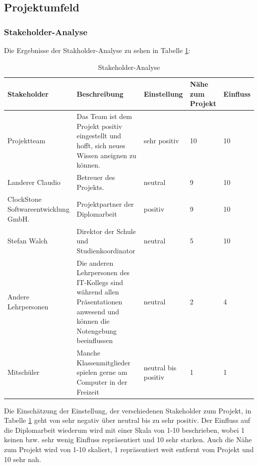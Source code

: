 \subsection{Projektumfeld}
\def \currentAuthor {Lukas Vogel} %
\subsubsection{Stakeholder-Analyse}
Die Ergebnisse der Stakholder-Analyse zu sehen in Tabelle \ref{Stakeholder-Analyse}:
\begin{table}[H]
		
	\renewcommand{\arraystretch}{1.5}
		\begin{tabular}{|p{3cm}|p{6cm}|p{3cm}|p{1.5cm}|p{1.5cm}|}
			\hline
			\textbf{Stakeholder} & \textbf{Beschreibung} & \textbf{Einstellung} & \textbf{Nähe zum Projekt} & \textbf{Einfluss} \\
			\hline
			Projektteam & Das Team ist dem Projekt positiv eingestellt und hofft, sich neues Wissen aneignen zu können. & sehr positiv & 10 & 10\\
			\hline
			Landerer Claudio & Betreuer des Projekts. & neutral & 9 &10\\
			\hline
			ClockStone Softwareentwicklung GmbH.& Projektpartner der Diplomarbeit & positiv & 9 & 10\\
			\hline
			Stefan Walch & Direktor der Schule und Studienkoordinator & neutral& 5 & 10\\
			\hline
			Andere Lehrpersonen & Die anderen Lehrpersonen des IT-Kollegs sind während allen Präsentationen anwesend und können die Notengebung beeinflussen & neutral& 2 & 4\\
			\hline
			Mitschüler & Manche Klassenmitglieder spielen gerne am Computer in der Freizeit	& neutral bis positiv & 1 & 1\\
			\hline
		\end{tabular}
\caption{Stakeholder-Analyse}
\label{Stakeholder-Analyse}
	\end{table}
Die Einschätzung der Einstellung, der verschiedenen Stakeholder zum Projekt, in Tabelle \ref{Stakeholder-Analyse} geht von sehr negativ über neutral bis zu sehr positiv. Der Einfluss auf die Diplomarbeit wiederum wird mit einer Skala von 1-10 beschrieben, wobei 1 keinen bzw. sehr wenig Einfluss repräsentiert und 10 sehr starken. Auch die Nähe zum Projekt wird von 1-10 skaliert, 1 repräsentiert weit entfernt vom Projekt und 10 sehr nah.
